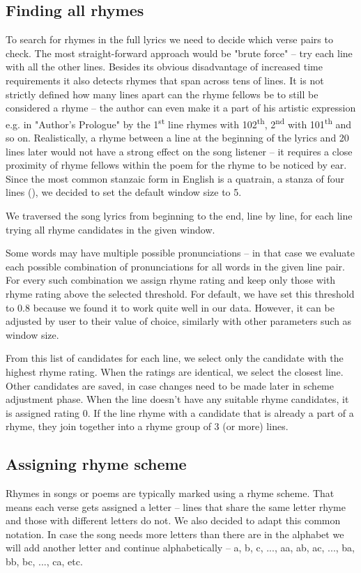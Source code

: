 \subsection{Finding all rhymes}
To search for rhymes in the full lyrics we need to decide which verse pairs to check. The most straight-forward approach would be "brute force" -- try each line with all the other lines. Besides its obvious disadvantage of increased time requirements it also detects rhymes that span across tens of lines. It is not strictly defined how many lines apart can the rhyme fellows be to still be considered a rhyme -- the author can even make it a part of his artistic expression  e.g. in "Author's Prologue" by \cite{thomas1952author} the 1\textsuperscript{st} line rhymes with 102\textsuperscript{th}, 2\textsuperscript{nd} with 101\textsuperscript{th} and so on. Realistically, a rhyme between a line at the beginning of the lyrics and 20 lines later would not have a strong effect on the song listener -- it requires a close proximity of rhyme fellows within the poem for the rhyme to be noticed by ear. Since the most common stanzaic form in English is a quatrain, a stanza of four lines (\cite{eastman1970norton}), we decided to set the default window size to 5. 

We traversed the song lyrics from beginning to the end, line by line, for each line trying all rhyme candidates in the given window.

Some words may have multiple possible pronunciations -- in that case we evaluate each possible combination of pronunciations for all words in the given line pair. For every such combination we assign rhyme rating and keep only those with rhyme rating above the selected threshold. For default, we have set this threshold to 0.8 because we found it to work quite well in our data. However, it can be adjusted by user to their value of choice, similarly with other parameters such as window size.  

From this list of candidates for each line, we select only the candidate with the highest rhyme rating. When the ratings are identical, we select the closest line. Other candidates are saved, in case changes need to be made later in scheme adjustment phase. When the line doesn't have any suitable rhyme candidates, it is assigned rating 0. If the line rhyme with a candidate that is already a part of a rhyme, they join together into a rhyme group of 3 (or more) lines.
 



\subsection{Assigning rhyme scheme}
 Rhymes in songs or poems are typically marked using a rhyme scheme. That means each verse gets assigned a letter -- lines that share the same letter rhyme and those with different letters do not. We also decided to adapt this common notation. In case the song needs more letters than there are in the alphabet we will add another letter and continue alphabetically -- a, b, c, ..., aa, ab, ac, ..., ba, bb, bc, ..., ca, etc.
 

